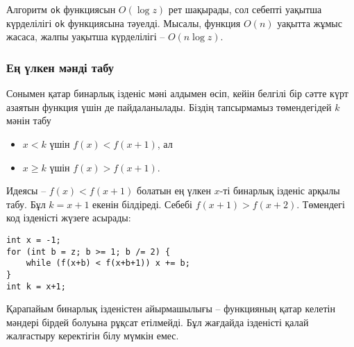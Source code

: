 Алгоритм \texttt{ok} функциясын 
$O(\log z)$ рет шақырады, сол себепті
уақытша күрделілігі \texttt{ok} функциясына тәуелді.
Мысалы, функция $O(n)$ уақытта жұмыс жасаса,
жалпы уақытша күрделілігі -- $O(n \log z)$.

\subsubsection{Ең үлкен мәнді табу}

Сонымен қатар бинарлық ізденіс
мәні алдымен өсіп, кейін белгілі бір сәтте
күрт азаятын функция үшін де пайдаланылады.
Біздің тапсырмамыз төмендегідей $k$ мәнін табу

\begin{itemize}
\item
 $x<k$ үшін $f(x)<f(x+1)$, ал
\item
$x \ge k$ үшін $f(x)>f(x+1)$.
\end{itemize}

Идеясы -- $f(x)<f(x+1)$ болатын ең үлкен
$x$-ті бинарлық ізденіс арқылы табу. 
Бұл $k=x+1$ екенін білдіреді. Себебі
$f(x+1)>f(x+2)$. Төмендегі код 
ізденісті жүзеге асырады:

\begin{lstlisting}
int x = -1;
for (int b = z; b >= 1; b /= 2) {
    while (f(x+b) < f(x+b+1)) x += b;
}
int k = x+1;
\end{lstlisting}

Қарапайым бинарлық ізденістен айырмашылығы --
функцияның қатар келетін мәндері бірдей 
болуына рұқсат етілмейді. Бұл жағдайда ізденісті қалай
жалғастыру керектігін білу мүмкін емес. 
